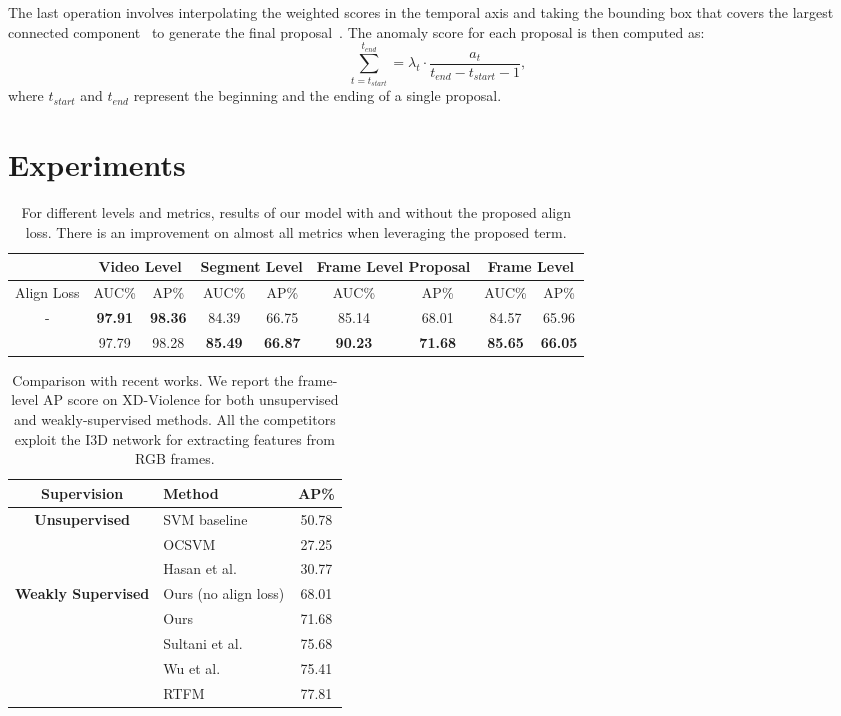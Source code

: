 \documentclass[runningheads]{llncs}
\newcommand{\cmark}{\ding{51}}\newcommand{\xmark}{\ding{55}}\renewcommand{\arraystretch}{1.2}
\begin{document}
The last operation involves interpolating the weighted scores in the temporal axis and taking the bounding box that covers the largest connected component~\cite{nguyen2018weakly} to generate the final proposal~\cite{zhou2016learning}. The anomaly score for each proposal is then computed as:
\begin{equation}
    \sum_{t=t_{start}}^{t_{end}} = \lambda_t \cdot \frac{a_t}{t_{end}-t_{start}-1},
\end{equation}
where $t_{start}$ and $t_{end}$ represent the beginning and the ending of a single proposal. \section{Experiments}
\begin{table}[t]
    \centering
    \begin{tabular}{c|c|c|c|c|c|c|c|c}
                    & \multicolumn{2}{c|}{Video Level} & \multicolumn{2}{c|}{Segment Level} & \multicolumn{2}{c|}{Frame Level Proposal} & \multicolumn{2}{c}{Frame Level} \\ \hline
    Align Loss  &  AUC\%    & AP\%  & AUC\% & AP\%  & AUC\% & AP\%  & AUC\% & AP\%  \\
-       & \textbf{97.91} & \textbf{98.36} & 84.39 & 66.75 & 85.14 & 68.01 & 84.57 & 65.96 \\ \cmark      & 97.79     & 98.28 & \textbf{85.49} &\textbf{ 66.87} & \textbf{90.23} & \textbf{71.68} & \textbf{85.65} & \textbf{66.05} \\
    \end{tabular}
    \caption{For different levels and metrics, results of our model with and without the proposed align loss. There is an improvement on almost all metrics when leveraging the proposed term.}
    \label{tab:align-ablation}
\end{table}
\begin{table}[t]
    \centering
    \begin{tabular}{c|l|c}
    Supervision & Method & AP\%    \\ \hline
    \multirow{3}{*}{\textbf{Unsupervised}} & SVM baseline  & 50.78   \\
        & OCSVM~\cite{scholkopf1999support}     & 27.25 \\
        & Hasan et al.~\cite{hasan2016learning} & 30.77 \\ \hline
    \multirow{5}{*}{\textbf{Weakly Supervised}} 
        & Ours (no align loss)                  & 68.01 \\
        & Ours                                  & 71.68 \\\cline{2-3}
        & Sultani et al.~\cite{sultani2018real} & 75.68  \\
        & Wu et al.~\cite{wu2020not}            & 75.41 \\
        & RTFM~\cite{tian2021weakly}            & 77.81 \\
    \end{tabular}
    \caption{Comparison with recent works. We report the frame-level AP score on XD-Violence for both unsupervised and weakly-supervised methods. All the competitors exploit the I3D network for extracting features from RGB frames.}
    \label{tab:competitors}
\end{table}
\end{document}
